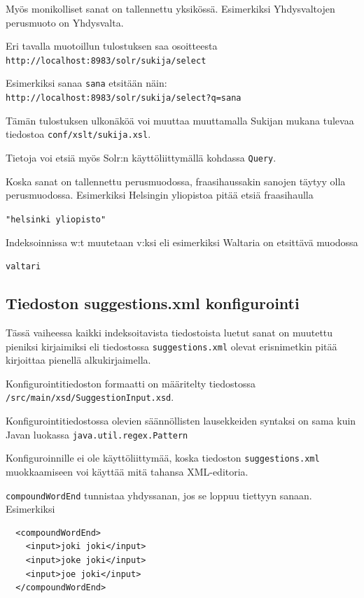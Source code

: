 \documentclass[12pt]{article}
\begin{document}
Myös monikolliset sanat on tallennettu yksikössä. Esimerkiksi
Yhdysvaltojen perusmuoto on Yhdysvalta.


Eri tavalla muotoillun tulostuksen saa osoitteesta
\verb=http://localhost:8983/solr/sukija/select=

Esimerkiksi sanaa \verb=sana= etsitään näin:
\verb|http://localhost:8983/solr/sukija/select?q=sana|

Tämän tulostuksen ulkonäköä voi muuttaa muuttamalla Sukijan mukana
tulevaa tiedostoa \verb=conf/xslt/sukija.xsl=.

Tietoja voi etsiä myös Solr:n käyttöliittymällä kohdassa \verb=Query=.


Koska sanat on tallennettu perusmuodossa, fraasihaussakin sanojen
täytyy olla perusmuodossa. Esimerkiksi Helsingin yliopistoa pitää
etsiä fraasihaulla

\verb="helsinki yliopisto"=

Indeksoinnissa w:t muutetaan v:ksi eli esimerkiksi Waltaria on etsittävä muodossa

\verb=valtari=


\subsection*{Tiedoston suggestions.xml konfigurointi}

Tässä vaiheessa kaikki indeksoitavista tiedostoista luetut sanat on
muutettu pieniksi kirjaimiksi eli tiedostossa
\verb=suggestions.xml= olevat erisnimetkin pitää kirjoittaa
pienellä alkukirjaimella.

Konfigurointitiedoston formaatti on määritelty tiedostossa
\verb=/src/main/xsd/SuggestionInput.xsd=.

Konfigurointitiedostossa olevien säännöllisten lausekkeiden syntaksi on
sama kuin Javan luokassa \verb=java.util.regex.Pattern=

Konfiguroinnille ei ole käyttöliittymää, koska tiedoston
\verb=suggestions.xml= muokkaamiseen voi käyttää mitä tahansa
XML-editoria.




\bigskip
\verb|compoundWordEnd| tunnistaa yhdyssanan, jos se loppuu tiettyyn sanaan.
Esimerkiksi

\begin{verbatim}
  <compoundWordEnd>
    <input>joki joki</input>
    <input>joke joki</input>
    <input>joe joki</input>
  </compoundWordEnd>
\end{verbatim}
\end{document}
